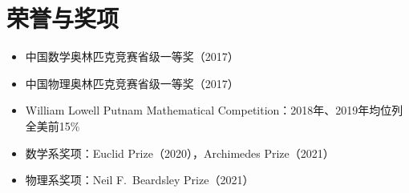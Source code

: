 \documentclass[11pt]{ctexart}
\begin{document}
\section*{荣誉与奖项}
\begin{itemize}
    \item 中国数学奥林匹克竞赛省级一等奖（2017）
    \item 中国物理奥林匹克竞赛省级一等奖（2017）
    \item William Lowell Putnam Mathematical Competition：2018年、2019年均位列全美前15\%
    \item 数学系奖项：Euclid Prize（2020），Archimedes Prize（2021）
    \item 物理系奖项：Neil F.\ Beardsley Prize（2021）
\end{itemize}
\end{document}
